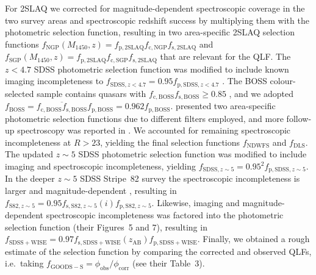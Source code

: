 \documentclass[a4paper,fleqn,usenatbib]{mnras}
\begin{document}
For 2SLAQ we corrected for magnitude-dependent spectroscopic coverage
in the two survey areas \citep[$f_\mathrm{c,NGP}\left(g\right)$ and
  $f_\mathrm{c,SGP}\left(g\right)$; Figure~4
  in][]{2009MNRAS.392...19C} and spectroscopic redshift success
\citep[$f_\mathrm{s,2SLAQ}\left(g\right)$; Figure~6b
  in][]{2009MNRAS.392...19C} by multiplying them with the photometric
selection function, resulting in two area-specific 2SLAQ selection
functions
$f_\mathrm{NGP}\left(M_{1450},z\right)=f_\mathrm{p,2SLAQ}f_\mathrm{c,NGP}f_\mathrm{s,2SLAQ}$
and
$f_\mathrm{SGP}\left(M_{1450},z\right)=f_\mathrm{p,2SLAQ}f_\mathrm{c,SGP}f_\mathrm{s,2SLAQ}$
that are relevant for the QLF.  The $z<4.7$ SDSS photometric selection
function was modified to include known imaging incompleteness to
$f_{\mathrm{SDSS},z<4.7}=0.95f_{\mathrm{p,SDSS},z<4.7}$
\citep{2006AJ....131.2766R}. The BOSS colour-selected sample contains
quasars with $f_\mathrm{c,BOSS}f_\mathrm{s,BOSS}\ge 0.85$
\citep{2013ApJ...773...14R}, and we adopted
$f_\mathrm{BOSS}=\overline{f_\mathrm{c,BOSS}f_\mathrm{s,BOSS}}f_\mathrm{p,BOSS}=0.962f_\mathrm{p,BOSS}$. \citet{2010ApJ...710.1498G}
presented two area-specific photometric selection functions due to
different filters employed, and more follow-up spectroscopy was
reported in \citet{2011ApJ...728L..26G}. We accounted for remaining
spectroscopic incompleteness at $R>23$, yielding the final selection
functions $f_\mathrm{NDWFS}$ and $f_\mathrm{DLS}$. The updated $z\sim
5$ SDSS photometric selection function \citep{2013ApJ...768..105M} was
modified to include imaging and spectroscopic incompleteness, yielding
$f_{\mathrm{SDSS},z\sim 5}=0.95^2f_{\mathrm{p,SDSS},z\sim 5}$. In the
deeper $z\sim 5$ SDSS Stripe~82 survey the spectroscopic
incompleteness is larger and magnitude-dependent \citep[Figure~14
  in][]{2013ApJ...768..105M}, resulting in $f_{\mathrm{S82},z\sim
  5}=0.95f_{\mathrm{s,S82},z\sim
  5}\left(i\right)f_{\mathrm{p,S82},z\sim 5}$. Likewise, imaging and
magnitude-dependent spectroscopic incompleteness was factored into the
\citet{2016ApJ...829...33Y} photometric selection function (their
Figures~5 and 7), resulting in
$f_\mathrm{SDSS+WISE}=0.97f_\mathrm{s,SDSS+WISE}\left(z_\mathrm{AB}\right)f_\mathrm{p,SDSS+WISE}$. Finally,
we obtained a rough estimate of the \citet{2015AA...578A..83G}
selection function by comparing the corrected and observed QLFs,
i.e.\ taking $f_\mathrm{GOODS-S}=\phi_\mathrm{obs}/\phi_\mathrm{corr}$
(see their Table~3).


\end{document}
